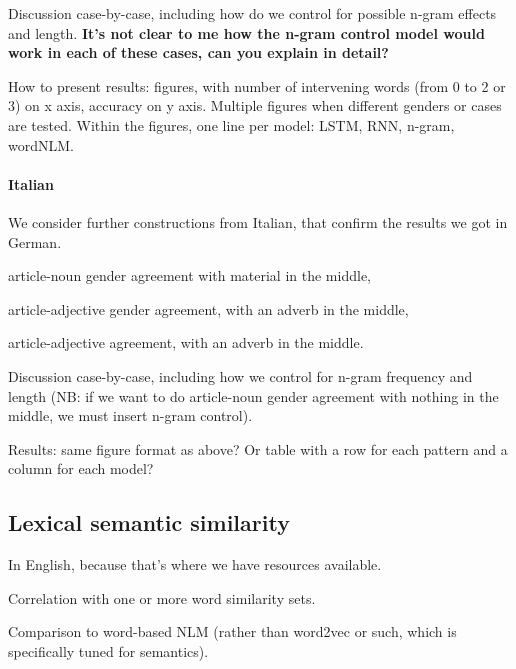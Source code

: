 Discussion case-by-case, including how do we control for possible
n-gram effects and length. \textbf{It's not clear to me how the n-gram
  control model would work in each of these cases, can you explain in
  detail?}

How to present results: figures, with number of intervening words
(from 0 to 2 or 3) on x axis, accuracy on y axis. Multiple figures
when different genders or cases are tested. Within the figures, one
line per model: LSTM, RNN, n-gram, wordNLM.

\paragraph{Italian} We consider further constructions from Italian,
that confirm the results we got in German.
\begin{inparaenum}[i)]
\item article-noun gender agreement with material in the middle,
\item article-adjective gender agreement, with an adverb in the middle,
\item article-adjective  agreement, with an adverb in the middle.
\end{inparaenum}

Discussion case-by-case, including how we control for n-gram frequency
and length (NB: if we want to do article-noun gender agreement with
nothing in the middle, we must insert n-gram control).

Results: same figure format as above? Or table with a row for each
pattern and a column for each model?


\subsection{Lexical semantic similarity}
\label{sec:similarity}

In English, because that's where we have resources available.

Correlation with one or more word similarity sets.

Comparison to word-based NLM (rather than word2vec or such, which is
specifically tuned for semantics).

